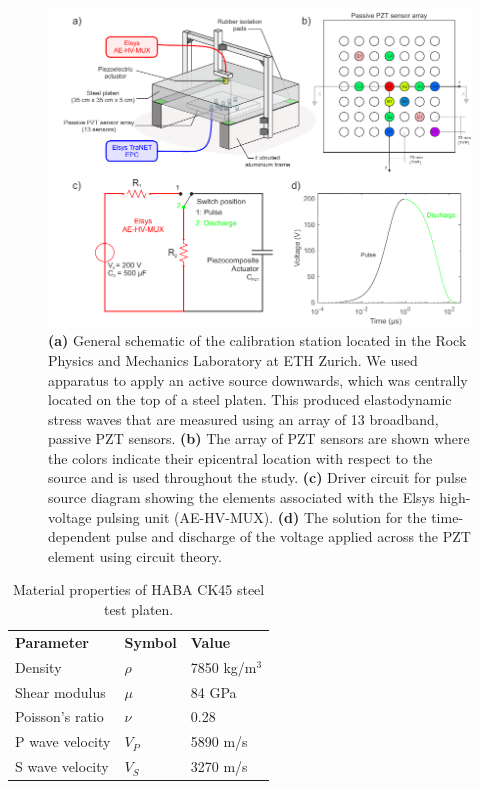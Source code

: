 \documentclass[preprint,3p, 11pt,authoryear]{elsarticle}
\begin{document}
\begin{figure}[ht]
     	\centering
\includegraphics[scale= 1.0]{FIG1.pdf} 
\caption{\textbf{(a)} General schematic of the calibration station located in the Rock Physics and Mechanics Laboratory at ETH Zurich. We used apparatus to apply an active source downwards, which was centrally located on the top of a steel platen. This produced elastodynamic stress waves that are measured using an array of 13 broadband, passive PZT sensors. \textbf{(b)} The array of PZT sensors are shown where the colors indicate their epicentral location with respect to the source and is used throughout the study. \textbf{(c)} Driver circuit for pulse source diagram showing the elements associated with the Elsys high-voltage pulsing unit (AE-HV-MUX). \textbf{(d)} The solution for the time-dependent pulse and discharge of the voltage applied across the PZT element using circuit theory. }
	\label{fig1} 
\end{figure}

\begin{table}[ht]
	\centering
	\caption{Material properties of HABA CK45 steel test platen.}
	\begin{tabular}{ m{5cm} m{2cm} m{4cm}} 
		\hline  
		\bf{Parameter} 			& \bf{Symbol} 		& \bf{Value}	\\
	    Density                 & $\rho$            & 7850 kg/m$^{3}$\\
	    Shear modulus           & $\mu$             & 84 GPa \\
	    Poisson's ratio         & $\nu$             & 0.28\\
	    P wave velocity         & $V_{P}$           & 5890 m/s\\
	    S wave velocity         & $V_{S}$           & 3270 m/s\\	    
		\hline  	
	\end{tabular}
	\label{table1}
\end{table}
\end{document}
